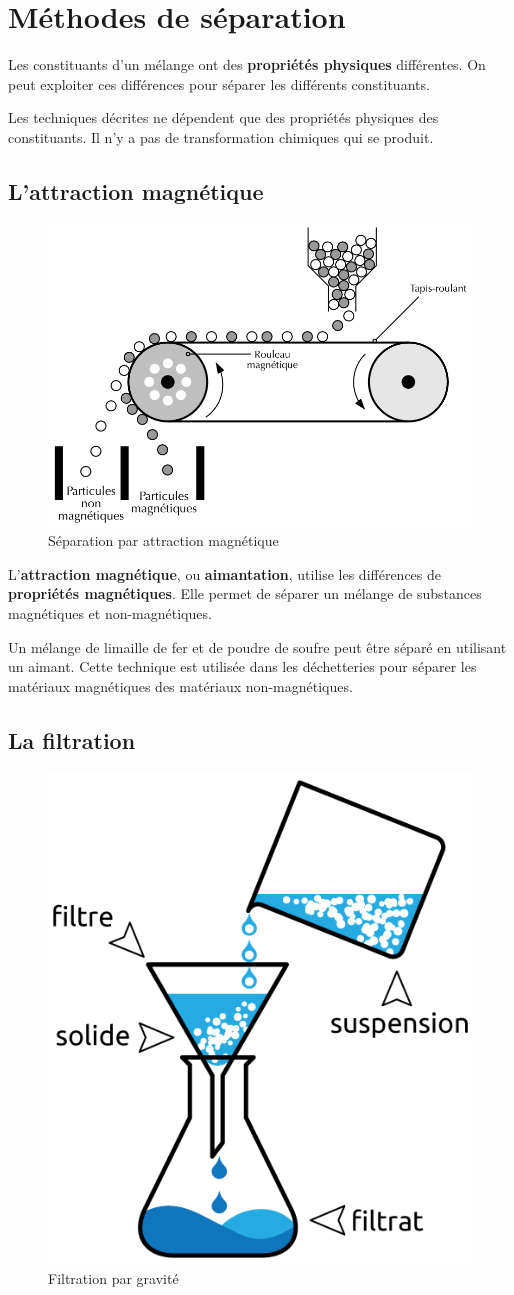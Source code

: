\documentclass[
  11pt,
  a4paper,
  openany]{book}
\begin{document}
\newpage

\section{Méthodes de séparation}\label{muxe9thodes-de-suxe9paration}

Les constituants d'un mélange ont des \textbf{propriétés physiques} différentes. On peut exploiter ces différences pour séparer les différents constituants.

Les techniques décrites ne dépendent que des propriétés physiques des constituants. Il n'y a pas de transformation chimiques qui se produit.

\subsection{L'attraction magnétique}\label{lattraction-magnuxe9tique}

\begin{figure}

{\centering \includegraphics[width=0.38\linewidth]{images/attraction-magnetique} 

}

\caption{Séparation par attraction magnétique}\label{fig:attraction-magnetique}
\end{figure}

L'\textbf{attraction magnétique}, ou \textbf{aimantation}, utilise les différences de \textbf{propriétés magnétiques}. Elle permet de séparer un mélange de substances magnétiques et non-magnétiques.

Un mélange de limaille de fer et de poudre de soufre peut être séparé en utilisant un aimant. Cette technique est utilisée dans les déchetteries pour séparer les matériaux magnétiques des matériaux non-magnétiques.

\subsection{La filtration}\label{la-filtration}

\begin{figure}

{\centering \includegraphics[width=0.28\linewidth]{images/filtration} 

}

\caption{Filtration par gravité}\label{fig:filtration}
\end{figure}
\end{document}
